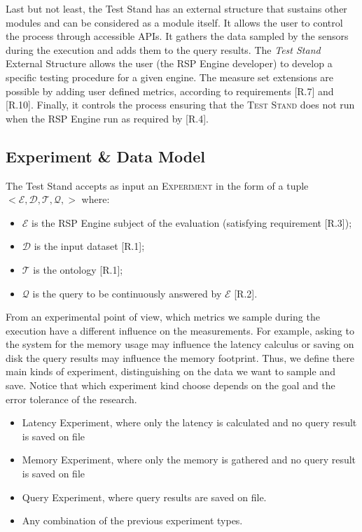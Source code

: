 Last but not least, the Test Stand has an external structure that sustains other modules and can be considered as a module itself. It allows the user to control the process through accessible APIs. It gathers the data sampled by the sensors during the execution and adds them to the query results. The \textit{Test Stand} External Structure allows the user (the RSP Engine developer) to develop a specific testing procedure for a given engine. The measure set extensions are possible by adding user defined metrics, according to requirements [R.7] and [R.10]. Finally, it controls the process ensuring that the \textsc{Test Stand} does not run when the RSP Engine run as required by [R.4].

\subsection{Experiment \& Data Model}\label{sec:test-stand-data-model}

\noindent The Test Stand accepts as input an \textsc{Experiment} in the form of a tuple \\ $<\mathcal{E},\mathcal{D},\mathcal{T},\mathcal{Q},>$ where:
\begin{itemize}
\item $\mathcal{E}$ is the RSP Engine subject of the evaluation (satisfying requirement [R.3]); 
\item $\mathcal{D}$ is the input dataset [R.1]; 
\item $\mathcal{T}$ is the ontology [R.1]; 
\item $\mathcal{Q}$ is the query to be continuously answered by $\mathcal{E}$ [R.2]. 
\end{itemize}

From an experimental point of view, which metrics we sample during the execution have a different influence on the measurements. For example, asking to the system for the memory usage may influence the latency calculus or saving on disk the query results may influence the memory footprint. Thus, we define there main kinds of experiment, distinguishing on the data we want to sample and save. Notice that which experiment kind choose depends on the goal and the error tolerance of the research.

\begin{itemize}
\item Latency Experiment, where only the latency is calculated and no query result is saved on file
\item Memory Experiment, where only the memory is gathered and no query result is saved on file
\item Query Experiment, where query results are saved on file.
\item Any combination of the previous experiment types.
\end{itemize}


